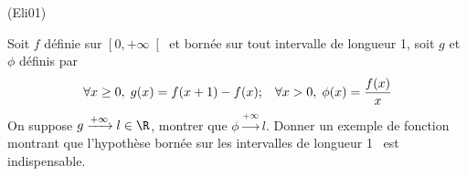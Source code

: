 \begin{tiny}(Eli01)\end{tiny} Soit $f$ d{\'e}finie sur $\left[ 0,+\infty \right[ $ et born{\'e}e sur tout intervalle de longueur 1, soit $g$ et $\phi$ définis par 
\begin{displaymath}
\forall x\geq 0,\; g(x)=f(x+1)-f(x);\hspace{0.3cm} \forall x>0,\; \phi(x)=\frac{f(x)}{x} 
\end{displaymath}
On suppose $g \xrightarrow{+\infty} l\in \R$, montrer que $\phi \xrightarrow{+\infty} l$.\newline
Donner un exemple de fonction montrant que l'hypothèse \og bornée sur les intervalles de longueur 1\fg~ est indispensable. 
